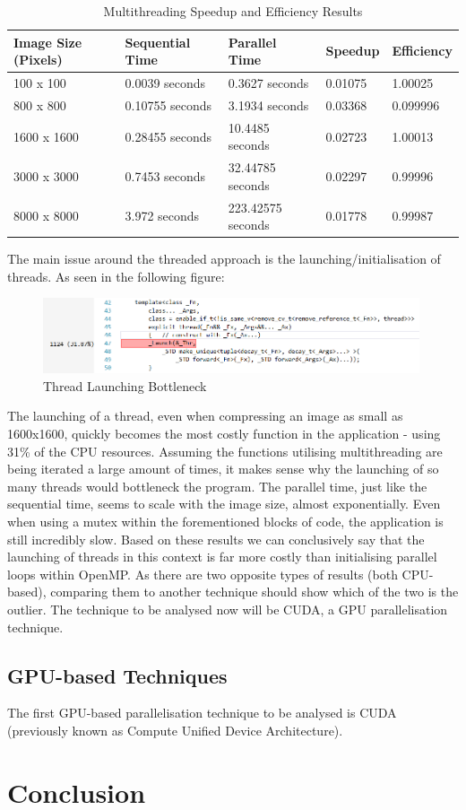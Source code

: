 \documentclass[12pt, a4paper]{article}
\begin{document}
\begin{table}[H]
    \centering
    \begin{tabular}{| l | l | l | l | l |}
    \hline
    Image Size (Pixels) & Sequential Time & Parallel Time & Speedup & Efficiency \\ \hline
    100 x 100 & 0.0039 seconds & 0.3627 seconds & 0.01075 & 1.00025 \\ \hline
    800 x 800 & 0.10755 seconds & 3.1934 seconds & 0.03368 & 0.099996 \\ \hline
    1600 x 1600 & 0.28455 seconds & 10.4485 seconds & 0.02723 & 1.00013 \\ \hline
    3000 x 3000 & 0.7453 seconds & 32.44785 seconds & 0.02297 & 0.99996 \\ \hline
    8000 x 8000 & 3.972 seconds & 223.42575 seconds & 0.01778 & 0.99987 \\ \hline
    \end{tabular}
    \caption{Multithreading Speedup and Efficiency Results}
\end{table}

The main issue around the threaded approach is the launching/initialisation of threads. As seen in the following figure:

\begin{figure}[H]
	\centering
		\includegraphics[width=0.99\textwidth]{"ThreadLaunch"}
		\caption{Thread Launching Bottleneck}
\end{figure}

The launching of a thread, even when compressing an image as small as 1600x1600, quickly becomes the most costly function in the application - using 31\% of the CPU resources. Assuming the functions utilising multithreading are being iterated a large amount of times, it makes sense why the launching of so many threads would bottleneck the program. The parallel time, just like the sequential time, seems to scale with the image size, almost exponentially. Even when using a mutex within the forementioned blocks of code, the application is still incredibly slow. Based on these results we can conclusively say that the launching of threads in this context is far more costly than initialising parallel loops within OpenMP. As there are two opposite types of results (both CPU-based), comparing them to another technique should show which of the two is the outlier. The technique to be analysed now will be CUDA, a GPU parallelisation technique.

\subsection{GPU-based Techniques}
The first GPU-based parallelisation technique to be analysed is CUDA (previously known as Compute Unified Device Architecture). 

\section{Conclusion}

\newpage


{}
\nocite{*}
\end{document}

